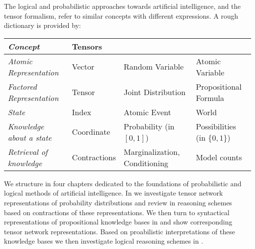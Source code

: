 The logical and probabilistic approaches towards artificial intelligence, and the tensor formalism, refer to similar concepts with different expressions. %
A rough dictionary is provided by:
\begin{center}
    \begin{tabular}{|p{\threecolumnwidth}|p{\fourcolumnwidth}|p{\fourcolumnwidth}|p{\fourcolumnwidth}|} %
        \hline
        \textit{Concept}                 & \textbf{Tensors} & \textbf{\ProbabilityTheory{}} & \textbf{\PropositionalLogic{}} \\
        \hline
        \textit{Atomic Representation}   & Vector           & Random Variable               & Atomic Variable                \\
        \textit{Factored Representation} & Tensor           & Joint Distribution            & Propositional Formula          \\
        \textit{State}                   & Index            & Atomic Event                  & World                          \\
        \textit{Knowledge about a state} & Coordinate       & Probability (in $[0,1]$)      & Possibilities (in $\{0,1\}$)   \\
        \textit{Retrieval of knowledge}  & Contractions     & Marginalization, Conditioning & Model counts                   \\
        \hline
    \end{tabular}
\end{center}



We structure  in four chapters dedicated to the foundations of probabilistic and logical methods of artificial intelligence.
In  we investigate tensor network representations of probability distributions and review in  reasoning schemes based on contractions of these representations.
We then turn to syntactical representations of propositional knowledge bases in  and show corresponding tensor network representations.
Based on proabilistic interpretations of these knowledge bases we then investigate logical reasoning schemes in .